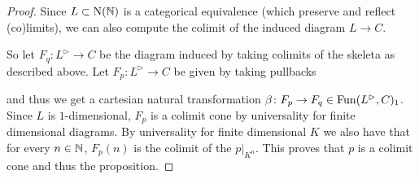 \begin{lemma}
\begin{proof}
        Since $L\subset\operatorname{N}(\mathbb{N})$ is a categorical equivalence (which preserve and reflect (co)limits), we can also compute the colimit of the induced diagram $L\to C$. %

        So let $F_q\colon L^{\rhd}\to C$ be the diagram induced by taking colimits of the skeleta as described above.
        Let $F_p\colon L^{\rhd}\to C$ be given by taking pullbacks
        \begin{center}
        \end{center}
        and thus we get a cartesian natural transformation $\beta\colon F_p\to F_q\in\operatorname{Fun}(L^{\rhd},C)_1$.
        Since $L$ is $1$-dimensional, $F_p$ is a colimit cone by universality for finite dimensional diagrams.
        By universality for finite dimensional $K$ we also have that for every $n\in\mathbb{N}$, $F_p(n)$ is the colimit of the $p|_{K^n}$.
        This proves that $p$ is a colimit cone and thus the proposition.
    \end{proof}
\end{lemma}
